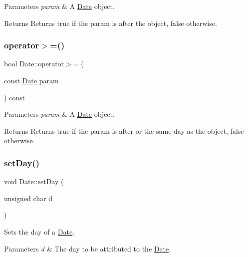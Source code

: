 \begin{DoxyParams}{Parameters}
{\em param} & A \hyperlink{classDate}{Date} object. \\
\hline
\end{DoxyParams}
\begin{DoxyReturn}{Returns}
Returns true if the param is after the object, false otherwise. 
\end{DoxyReturn}
\mbox{\label{classDate_a8dd74549b9a54b1b91b965cc3bfdcce0}} 
\subsubsection{\texorpdfstring{operator$>$=()}{operator>=()}}
{\footnotesize\ttfamily bool Date\+::operator$>$= (\begin{DoxyParamCaption}\item[{const \hyperlink{classDate}{Date}}]{param }\end{DoxyParamCaption}) const}


\begin{DoxyParams}{Parameters}
{\em param} & A \hyperlink{classDate}{Date} object. \\
\hline
\end{DoxyParams}
\begin{DoxyReturn}{Returns}
Returns true if the param is after or the same day as the object, false otherwise. 
\end{DoxyReturn}
\mbox{\label{classDate_a41746b6e3a6f51b1c0f74426d72dcd2e}} 
\subsubsection{\texorpdfstring{set\+Day()}{setDay()}}
{\footnotesize\ttfamily void Date\+::set\+Day (\begin{DoxyParamCaption}\item[{unsigned char}]{d }\end{DoxyParamCaption})}



Sets the day of a \hyperlink{classDate}{Date}. 


\begin{DoxyParams}{Parameters}
{\em d} & The day to be attributed to the \hyperlink{classDate}{Date}. \\
\hline
\end{DoxyParams}
\mbox{\label{classDate_a722bc2dc26d3ab2b7e7184babaeb760d}} 
